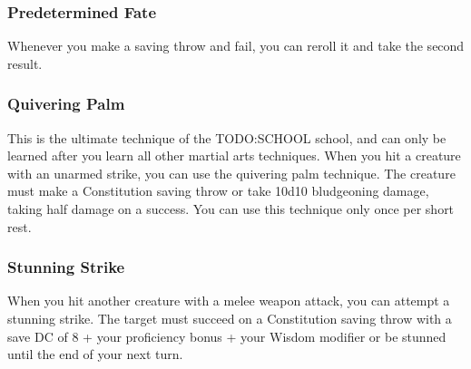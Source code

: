 \subsubsection{Predetermined Fate} \label{mtec::predeterminedfate}
Whenever you make a saving throw and fail, you can reroll it and take the second result.

\subsubsection{Quivering Palm} \label{mtec::quiveringpalm}
This is the ultimate technique of the TODO:SCHOOL school, and can only be learned after you learn all other martial arts techniques.
When you hit a creature with an unarmed strike, you can use the quivering palm technique.
The creature must make a Constitution saving throw or take 10d10 bludgeoning damage, taking half damage on a success.
You can use this technique only once per short rest.

\subsubsection{Stunning Strike} \label{mtec::stunningstrike}
When you hit another creature with a melee weapon attack, you can attempt a stunning strike.
The target must succeed on a Constitution saving throw with a save DC of 8 + your proficiency bonus + your Wisdom modifier or be stunned until the end of your next turn.
